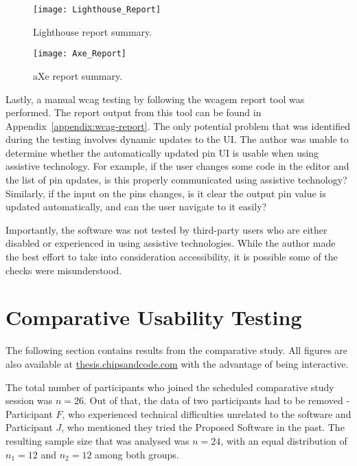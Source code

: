 \begin{figure}[H]
    \texttt{[image: Lighthouse\_Report]}
    \caption{Lighthouse report summary.}
    \label{fig:lighthouse-report}
\end{figure}

\begin{figure}[H]
    \texttt{[image: Axe\_Report]}
    \caption{aXe report summary.}
    \label{fig:axe-report}
\end{figure}

Lastly, a manual \gls{wcag} testing by following the \gls{wcagem} report tool was performed.
The report output from this tool can be found in Appendix~\ref{appendix:wcag-report}.
The only potential problem that was identified during the testing involves dynamic updates to the UI.
The author was unable to determine whether the automatically updated pin UI is usable when using assistive technology.
For example, if the user changes some code in the editor and the list of pin updates, is this properly communicated using assistive technology?
Similarly, if the input on the pins changes, is it clear the output pin value is updated automatically, and can the user navigate to it easily?

Importantly, the software was not tested by third-party users who are either disabled or experienced in using assistive technologies.
While the author made the best effort to take into consideration accessibility, it is possible some of the checks were misunderstood.

\section{Comparative Usability Testing}
\label{Evaluation-UX}

The following section contains results from the comparative study.
All figures are also available at \href{https://thesis.chipsandcode.com}{thesis.chipsandcode.com} with the advantage of being interactive.

The total number of participants who joined the scheduled comparative study session was $n=26$.
Out of that, the data of two participants had to be removed - Participant $F$, who experienced technical difficulties unrelated to the software and Participant $J$, who mentioned they tried the Proposed Software in the past.
The resulting sample size that was analysed was $n=24$, with an equal distribution of $n_1=12$ and $n_2=12$ among both groups.

